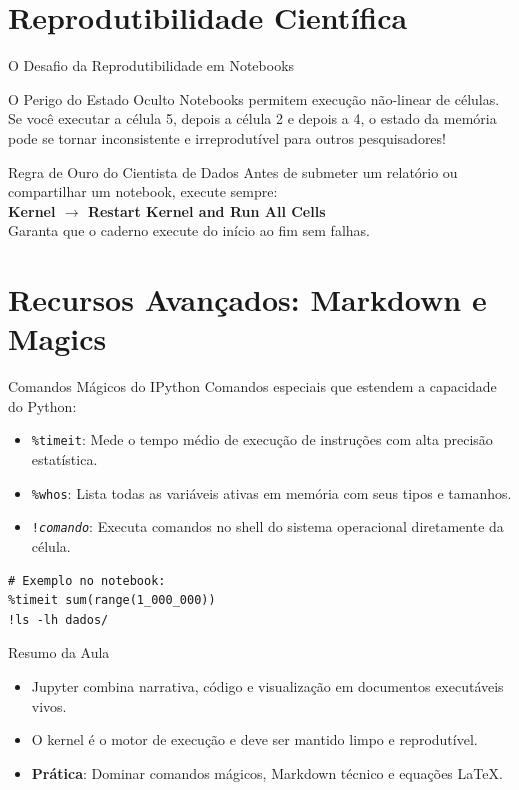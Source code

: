 \documentclass[aspectratio=169, 10pt]{beamer}
\begin{document}
\section{Reprodutibilidade Científica}

\begin{frame}{O Desafio da Reprodutibilidade em Notebooks}
  \begin{alertblock}{O Perigo do Estado Oculto}
    Notebooks permitem execução não-linear de células. Se você executar a célula 5, depois a célula 2 e depois a 4, o estado da memória pode se tornar inconsistente e irreprodutível para outros pesquisadores!
  \end{alertblock}
  \begin{block}{Regra de Ouro do Cientista de Dados}
    Antes de submeter um relatório ou compartilhar um notebook, execute sempre: \\
    \textbf{Kernel $\rightarrow$ Restart Kernel and Run All Cells} \\
    Garanta que o caderno execute do início ao fim sem falhas.
  \end{block}
\end{frame}

\section{Recursos Avançados: Markdown e Magics}

\begin{frame}[fragile]{Comandos Mágicos do IPython}
  Comandos especiais que estendem a capacidade do Python:
  \begin{itemize}
    \item \texttt{\%timeit}: Mede o tempo médio de execução de instruções com alta precisão estatística.
    \item \texttt{\%whos}: Lista todas as variáveis ativas em memória com seus tipos e tamanhos.
    \item \texttt{!\textit{comando}}: Executa comandos no shell do sistema operacional diretamente da célula.
  \end{itemize}
  \begin{lstlisting}
# Exemplo no notebook:
%timeit sum(range(1_000_000))
!ls -lh dados/
  \end{lstlisting}
\end{frame}

\begin{frame}{Resumo da Aula}
  \begin{itemize}
    \item Jupyter combina narrativa, código e visualização em documentos executáveis vivos.
    \item O kernel é o motor de execução e deve ser mantido limpo e reprodutível.
    \item \textbf{Prática}: Dominar comandos mágicos, Markdown técnico e equações LaTeX.
  \end{itemize}
\end{frame}
\end{document}
